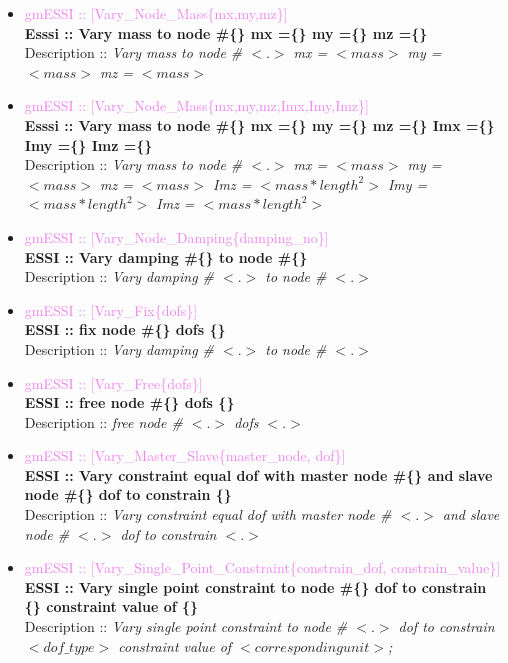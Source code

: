\documentclass[11pt]{article}
\begin{document}
\begin{itemize}

  \item \textcolor{violet}{gmESSI :: [Vary\_Node\_Mass\{mx,my,mz\}]}\\
  \textbf{Esssi :: Vary mass to node \#\{\} mx =\{\} my =\{\} mz =\{\}}\\
  Description :: \textit{Vary mass to node \# $<.>$ mx = $<mass>$ my = $<mass>$
  mz = $<mass>$}

  \item \textcolor{violet}{gmESSI :: [Vary\_Node\_Mass\{mx,my,mz,Imx,Imy,Imz\}]} \\ 
  \textbf{Esssi :: Vary mass to node \#\{\} mx =\{\} my =\{\} mz =\{\} Imx =\{\} Imy =\{\} Imz
  =\{\}}\\   Description :: \textit{Vary mass to node \# $<.>$ mx = $<mass>$ my =
  $<mass>$ mz = $<mass>$ Imz = $<mass*length^2>$ Imy = $<mass*length^2>$ Imz =
  $<mass*length^2>$}

  \item \textcolor{violet}{ gmESSI :: [Vary\_Node\_Damping\{damping\_no\}]}\\
  \textbf{ ESSI :: Vary damping \#\{\} to node \#\{\}}\\
  Description :: \textit{Vary damping \# $<.>$ to node \# $<.>$}

  \item \textcolor{violet}{ gmESSI :: [Vary\_Fix\{dofs\}]}\\
  \textbf{ ESSI :: fix node \#\{\} dofs \{\}}\\
  Description :: \textit{Vary damping \# $<.>$ to node \# $<.>$}

  \item \textcolor{violet}{ gmESSI :: [Vary\_Free\{dofs\}]}\\
  \textbf{ ESSI :: free node \#\{\} dofs \{\}}\\
  Description :: \textit{free node \# $<.>$ dofs $<.>$}

  \item \textcolor{violet}{ gmESSI :: [Vary\_Master\_Slave\{master\_node, dof\}]}\\
  \textbf{ ESSI :: Vary constraint equal dof with master node \#\{\} and slave node \#\{\}  dof to constrain \{\}}\\
  Description :: \textit{Vary constraint equal dof with master node \# $<.>$ and slave node \# $<.>$ dof to constrain $<.>$}

  \item \textcolor{violet}{ gmESSI :: [Vary\_Single\_Point\_Constraint\{constrain\_dof, constrain\_value\}]}\\
  \textbf{ ESSI :: Vary single point constraint to node \#\{\}  dof to constrain \{\} constraint value of \{\}}\\
  Description :: \textit{Vary single point constraint to node \# $<.>$ dof to constrain $<dof\_type>$ constraint value of $<corresponding unit>$;}


\end{itemize}
\end{document}
